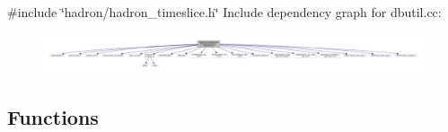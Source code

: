 {\ttfamily \#include \char`\"{}hadron/hadron\+\_\+timeslice.\+h\char`\"{}}\newline
Include dependency graph for dbutil.\+cc\+:
\nopagebreak
\begin{figure}[H]
\begin{center}
\leavevmode
\includegraphics[width=350pt]{d3/d6a/adat-devel_2main_2dbutil_2dbutil_8cc__incl}
\end{center}
\end{figure}
\subsection*{Functions}
